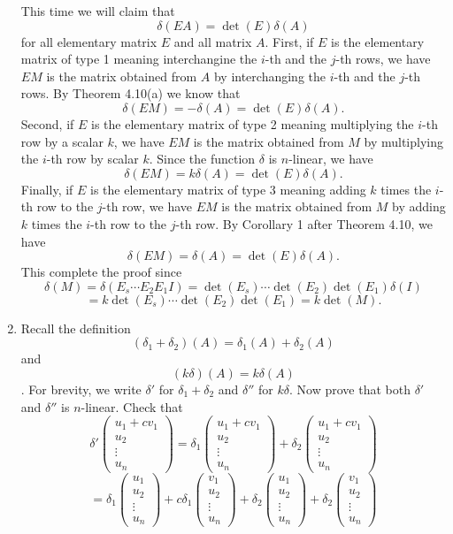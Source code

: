 \begin{enumerate}
This time we will claim that 
\[\delta(EA)=\det(E)\delta(A)\]
for all elementary matrix $E$ and all matrix $A$. First, if $E$ is the elementary matrix of type 1 meaning interchangine the $i$-th and the $j$-th rows, we have $EM$ is the matrix obtained from $A$ by interchanging the $i$-th and the $j$-th rows. By Theorem 4.10(a) we know that 
\[\delta(EM)=-\delta(A)=\det(E)\delta(A).\]
Second, if $E$ is the elementary matrix of type 2 meaning multiplying the $i$-th row by a scalar $k$, we have $EM$ is the matrix obtained from $M$ by multiplying the $i$-th row by scalar $k$. Since the function $\delta$ is $n$-linear, we have 
\[\delta(EM)=k\delta(A)=\det(E)\delta(A).\]
Finally, if $E$ is the elementary matrix of type 3 meaning adding $k$ times the $i$-th row to the $j$-th row, we have $EM$ is the matrix obtained from $M$ by adding $k$ times the $i$-th row to the $j$-th row. By Corollary 1 after Theorem 4.10, we have 
\[\delta(EM)=\delta(A)=\det(E)\delta(A).\]
This complete the proof since 
\[\delta(M)=\delta(E_s\cdots E_2E_1I)=\det(E_s)\cdots \det(E_2)\det(E_1)\delta(I)\]
\[=k\det(E_s)\cdots \det(E_2)\det(E_1)=k\det(M).\]
\item Recall the definition 
\[(\delta_1+\delta_2)(A)=\delta_1(A)+\delta_2(A)\]
and 
\[(k\delta)(A)=k\delta(A)\]. For brevity, we write $\delta'$ for $\delta_1+\delta_2$ and $\delta''$ for $k\delta$. Now prove that both $\delta'$ and $\delta''$ is $n$-linear. Check that 
\[\delta'\begin{pmatrix}u_1+cv_1\\u_2\\\vdots \\u_n\end{pmatrix}=\delta_1\begin{pmatrix}u_1+cv_1\\u_2\\\vdots \\u_n\end{pmatrix}+\delta_2\begin{pmatrix}u_1+cv_1\\u_2\\\vdots \\u_n\end{pmatrix}\]
\[=\delta_1\begin{pmatrix}u_1\\u_2\\\vdots \\u_n\end{pmatrix}+c\delta_1\begin{pmatrix}v_1\\u_2\\\vdots \\u_n\end{pmatrix}+\delta_2\begin{pmatrix}u_1\\u_2\\\vdots \\u_n\end{pmatrix}+\delta_2\begin{pmatrix}v_1\\u_2\\\vdots \\u_n\end{pmatrix}\]

\end{enumerate}
